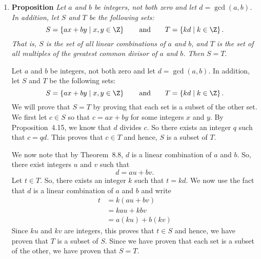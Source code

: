 \documentclass[11pt]{article}
\begin{document}
\begin{enumerate}
\item \textbf{Proposition} \emph{Let $a$ and $b$ be integers, not both zero and let 
$d = \gcd \left(a, b \right)$.  In addition, let $S$ and $T$ be the following sets:
\[
S = \left\{ ax + by \mid x, y \in \Z \right\} \qquad \text{and} \qquad 
T = \left\{ kd \mid k \in \Z \right\}.
\]
That is, $S$ is the set of all linear combinations of $a$ and $b$, and $T$ is the set of all multiples of the greatest common divisor of $a$ and $b$.  Then $S = T$}.

\begin{myproof}
Let $a$ and $b$ be integers, not both zero and let 
$d = \gcd \left(a, b \right)$.  In addition, let $S$ and $T$ be the following sets:
\[
S = \left\{ ax + by \mid x, y \in \Z \right\} \qquad \text{and} \qquad 
T = \left\{ kd \mid k \in \Z \right\}.
\]
We will prove that $S = T$ by proving that each set is a subset of the other set. We first let $c \in S$ so that $c = ax + by$ for some integers $x$ and $y$.  By Proposition~4.15, we know that $d$ divides $c$.  So there exists an integer $q$ such that $c = qd$.  This proves that $c \in T$ and hence, $S$ is a subset of $T$. 


We now note that by Theorem~8.8, $d$ is a linear combination of $a$ and $b$.  So, there exist integers $u$ and $v$ such that
\[
d = au + bv.
\]
Let $t \in T$.  So, there exists an integer $k$ such that $t = kd$.  We now use the fact that $d$ is a linear combination of $a$ and $b$ and write
\begin{align*}
t &= k \left( au + bv \right) \\
  &= kau + kbv \\
  &= a(ku) + b(kv)
\end{align*}
Since $ku$ and $kv$ are integers, this proves that $t \in S$ and hence, we have proven that $T$ is a subset of $S$.  Since we have proven that each set is a subset of the other, we have proven that $S = T$.
\end{myproof}


\end{enumerate}
\end{document}

